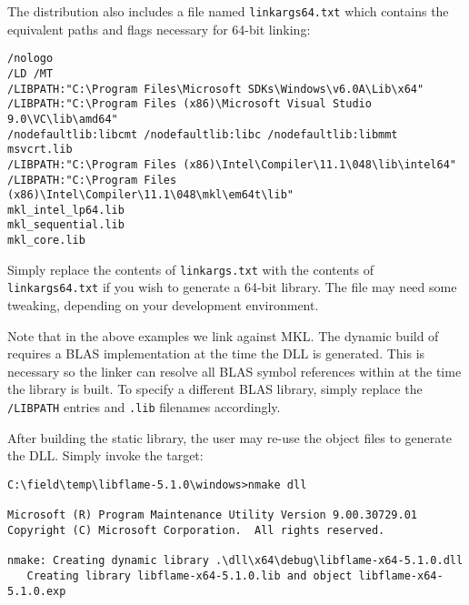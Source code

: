 \noindent
The \libflame distribution also includes a file named {\tt linkargs64.txt}
which contains the equivalent paths and flags necessary for 64-bit linking:

\begin{Verbatim}[frame=single,framesep=2.5mm,xleftmargin=5mm,fontsize=\footnotesize]
/nologo
/LD /MT 
/LIBPATH:"C:\Program Files\Microsoft SDKs\Windows\v6.0A\Lib\x64"
/LIBPATH:"C:\Program Files (x86)\Microsoft Visual Studio 9.0\VC\lib\amd64"
/nodefaultlib:libcmt /nodefaultlib:libc /nodefaultlib:libmmt
msvcrt.lib
/LIBPATH:"C:\Program Files (x86)\Intel\Compiler\11.1\048\lib\intel64"
/LIBPATH:"C:\Program Files (x86)\Intel\Compiler\11.1\048\mkl\em64t\lib"
mkl_intel_lp64.lib
mkl_sequential.lib
mkl_core.lib
\end{Verbatim}



\noindent
Simply replace the contents of {\tt linkargs.txt} with the contents of
{\tt linkargs64.txt} if you wish to generate a 64-bit library.
The file may need some tweaking, depending on your development environment.


Note that in the above examples we link against MKL.
The dynamic build of \libflame requires a BLAS implementation at the time
the DLL is generated.
This is necessary so the linker can resolve all BLAS symbol references within
\libflame at the time the library is built.
To specify a different BLAS library, simply replace the {\tt /LIBPATH} entries
and {\tt .lib} filenames accordingly.

After building the static library, the user may re-use the object files
to generate the DLL.
Simply invoke the \dll target:

\begin{Verbatim}[frame=single,framesep=2.5mm,xleftmargin=5mm,fontsize=\footnotesize]
C:\field\temp\libflame-5.1.0\windows>nmake dll

Microsoft (R) Program Maintenance Utility Version 9.00.30729.01
Copyright (C) Microsoft Corporation.  All rights reserved.

nmake: Creating dynamic library .\dll\x64\debug\libflame-x64-5.1.0.dll
   Creating library libflame-x64-5.1.0.lib and object libflame-x64-5.1.0.exp
\end{Verbatim}

